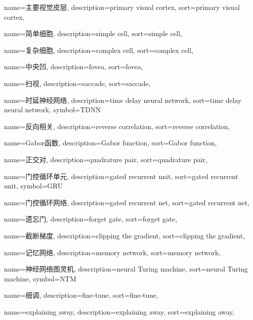 {
  name=主要视觉皮层,
  description={primary visual cortex},
  sort={primary visual cortex},
}

{
  name=简单细胞,
  description={simple cell},
  sort={simple cell},
}

{
  name=复杂细胞,
  description={complex cell},
  sort={complex cell},
}

{
  name=中央凹,
  description={fovea},
  sort={fovea},
}

{
  name=扫视,
  description={saccade},
  sort={saccade},
}

{
  name=时延神经网络,
  description={time delay neural network},
  sort={time delay neural network},
  symbol={TDNN}
}

{
  name=反向相关,
  description={reverse correlation},
  sort={reverse correlation},
}

{
  name=Gabor函数,
  description={Gabor function},
  sort={Gabor function},
}

{
  name=正交对,
  description={quadrature pair},
  sort={quadrature pair},
}

{
  name=门控循环单元,
  description={gated recurrent unit},
  sort={gated recurrent unit},
  symbol={GRU}
}

{
  name=门控循环网络,
  description={gated recurrent net},
  sort={gated recurrent net}, 
}

{
  name=遗忘门,
  description={forget gate},
  sort={forget gate},
}

{
  name=截断梯度,
  description={clipping the gradient},
  sort={clipping the gradient},
}

{
  name=记忆网络,
  description={memory network},
  sort={memory network},
}

{
  name=神经网络图灵机,
  description={neural Turing machine},
  sort={neural Turing machine},
  symbol={NTM}
}

{
  name=细调,
  description={fine-tune},
  sort={fine-tune},
}

{
  name=explaining away,
  description={explaining away},
  sort={explaining away},
}

